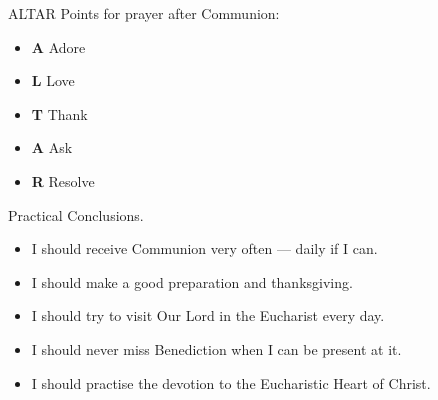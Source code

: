 \documentclass{beamer}
\begin{document}
\begin{frame}{ALTAR}
Points for prayer after Communion:
\begin{itemize}
\item \textbf{A} Adore
\item \textbf{L} Love
\item \textbf{T} Thank
\item \textbf{A} Ask
\item \textbf{R} Resolve
\end{itemize}
\end{frame}

\begin{frame}{Practical Conclusions.}
\begin{itemize}
\item I should receive Communion very often --- daily if I can.
\item I should make a good preparation and thanksgiving.
\item I should try to visit Our Lord in the Eucharist every day.
\item I should never miss Benediction when I can be present at it.
\item I should practise the devotion to the Eucharistic Heart of Christ.
\end{itemize}
\end{frame}
\end{document}
